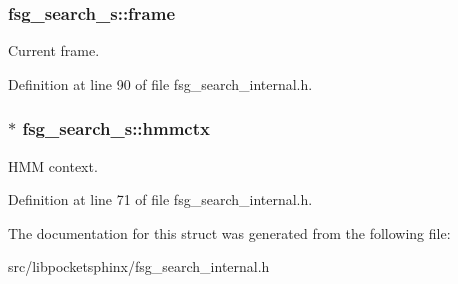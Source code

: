 \subsubsection[{frame}]{ fsg\-\_\-search\-\_\-s\-::frame}\label{structfsg__search__s_acdac4164d14d531b14c11a823dd22893}


Current frame. 



Definition at line 90 of file fsg\-\_\-search\-\_\-internal.\-h.

\subsubsection[{hmmctx}]{$\ast$ fsg\-\_\-search\-\_\-s\-::hmmctx}\label{structfsg__search__s_a7407bdf5f311caf9d46817b3387b798c}


H\-M\-M context. 



Definition at line 71 of file fsg\-\_\-search\-\_\-internal.\-h.



The documentation for this struct was generated from the following file\-:\begin{DoxyCompactItemize}
\item 
src/libpocketsphinx/fsg\-\_\-search\-\_\-internal.\-h\end{DoxyCompactItemize}
